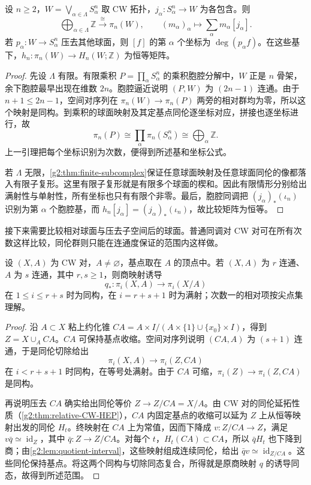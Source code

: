 \begin{lemma}\label{g2:lem:wedge-sphere-first-homotopy}
	设 \(n\ge2\)，\(W=\bigvee_{\alpha\in\Lambda}S^n_\alpha\) 取 CW 拓扑，\(j_\alpha:S^n_\alpha\to W\) 为各包含。则
	\[
		\bigoplus_{\alpha\in\Lambda}\mathbb Z\xrightarrow{\ \cong\ }\pi_n(W),\qquad
		(m_\alpha)_\alpha\longmapsto\sum_\alpha m_\alpha[j_\alpha].
	\]
	若 \(p_\alpha:W\to S^n_\alpha\) 压去其他球面，则 \([f]\) 的第 \(\alpha\) 个坐标为 \(\deg(p_\alpha f)\)。在这些基下，\(h_n:\pi_n(W)\to H_n(W;\mathbb Z)\) 为恒等矩阵。
\end{lemma}
\begin{proof}
	先设 \(\Lambda\) 有限。有限乘积 \(P=\prod_\alpha S^n_\alpha\) 的乘积胞腔分解中，\(W\) 正是 \(n\) 骨架，余下胞腔最早出现在维数 \(2n\)。胞腔逼近说明 \((P,W)\) 为 \((2n-1)\) 连通。由于 \(n+1\le2n-1\)，空间对序列在 \(\pi_n(W)\to\pi_n(P)\) 两旁的相对群均为零，所以这个映射是同构。到乘积的球面映射及其定基点同伦逐坐标对应，拼接也逐坐标进行，故
	\[
		\pi_n(P)\cong\prod_\alpha\pi_n(S^n_\alpha)\cong\bigoplus_\alpha\mathbb Z.
	\]
	上一引理把每个坐标识别为次数，便得到所述基和坐标公式。

	若 \(\Lambda\) 无限，\cref{g2:thm:finite-subcomplex}保证任意球面映射及任意球面同伦的像都落入有限子复形。这里有限子复形就是有限多个球面的楔和。因此有限情形分别给出满射性与单射性，所有坐标也只有有限个非零。最后，胞腔同调把 \((j_\alpha)_*(\iota_n)\) 识别为第 \(\alpha\) 个胞腔基，而 \(h_n[j_\alpha]=(j_\alpha)_*(\iota_n)\)，故比较矩阵为恒等。
\end{proof}

接下来需要比较相对球面与压去子空间后的球面。普通同调对 CW 对可在所有次数这样比较，同伦群则只能在连通度保证的范围内这样做。

\begin{lemma}\label{g2:lem:relative-quotient-homotopy}
	设 \((X,A)\) 为 CW 对，\(A\ne\varnothing\)，基点取在 \(A\) 的顶点中。若 \((X,A)\) 为 \(r\) 连通、\(A\) 为 \(s\) 连通，其中 \(r,s\ge1\)，则商映射诱导
	\[
		q_*:\pi_i(X,A)\longrightarrow\pi_i(X/A)
	\]
	在 \(1\le i\le r+s\) 时为同构，在 \(i=r+s+1\) 时为满射；次数一的相对项按尖点集理解。
\end{lemma}
\begin{proof}
	沿 \(A\subset X\) 粘上约化锥 \(CA=A\times I/(A\times\{1\}\cup\{x_0\}\times I)\)，得到 \(Z=X\cup_A CA\)。\(CA\) 可保持基点收缩。空间对序列说明 \((CA,A)\) 为 \((s+1)\) 连通，于是同伦切除给出
	\[
		\pi_i(X,A)\longrightarrow\pi_i(Z,CA)
	\]
	在 \(i<r+s+1\) 时同构，在等号处满射。由于 \(CA\) 可缩，\(\pi_i(Z)\to\pi_i(Z,CA)\) 是同构。

	再说明压去 \(CA\) 确实给出同伦等价 \(Z\to Z/CA=X/A\)。由 CW 对的同伦延拓性质（\cref{g2:thm:relative-CW-HEP}），\(CA\) 内固定基点的收缩可以延为 \(Z\) 上从恒等映射出发的同伦 \(H_t\)。终映射在 \(CA\) 上为常值，因而下降成 \(v:Z/CA\to Z\)，满足 \(v\bar q\simeq\operatorname{id}_Z\)，其中 \(\bar q:Z\to Z/CA\)。对每个 \(t\)，\(H_t(CA)\subset CA\)，所以 \(\bar qH_t\) 也下降到商；由\cref{g2:lem:quotient-interval}，这些映射组成连续同伦，给出 \(\bar qv\simeq\operatorname{id}_{Z/CA}\)。这些同伦保持基点。将这两个同构与切除同态复合，所得就是原商映射 \(q\) 的诱导同态，故得到所述范围。
\end{proof}

